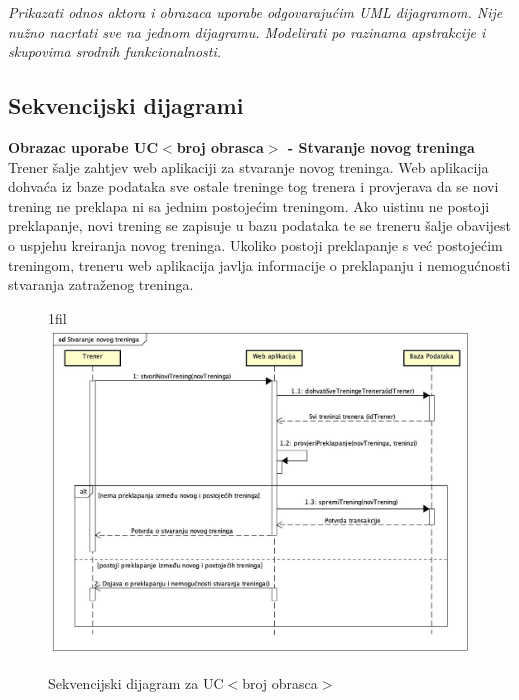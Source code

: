 					\textit{Prikazati odnos aktora i obrazaca uporabe odgovarajućim UML dijagramom. Nije nužno nacrtati sve na jednom dijagramu. Modelirati po razinama apstrakcije i skupovima srodnih funkcionalnosti.}
				\eject		
				
								
				
				
			\subsection{Sekvencijski dijagrami}
			
			
				\textbf{Obrazac uporabe UC$<$broj obrasca$>$ - Stvaranje novog treninga}\\
				Trener šalje zahtjev web aplikaciji za stvaranje novog treninga. Web aplikacija dohvaća iz baze podataka sve ostale treninge tog trenera i provjerava da se novi trening ne preklapa ni sa jednim postojećim treningom. Ako uistinu ne postoji preklapanje, novi trening se zapisuje u bazu podataka te se treneru šalje obavijest o uspjehu kreiranja novog treninga. Ukoliko postoji preklapanje s već postojećim treningom, treneru web aplikacija javlja informacije o preklapanju i nemogućnosti stvaranja zatraženog treninga.
				\eject
				
				\makeatletter
                                                                        \newcommand*{\centerfloat}{%
                                                                          \parindent \z@
                                                                          \leftskip \z@ \@plus 1fil \@minus \textwidth
                                                                          \rightskip\leftskip
                                                                          \parfillskip \z@skip}
                                                                   \makeatother
				
				\begin{figure}[H]
					\centerfloat
        					\includegraphics[scale=0.48]{dijagrami/StvaranjeNovogTreninga.jpg} %
        					\caption{Sekvencijski dijagram za UC$<$broj obrasca$>$}
        					\label{fig:UC$<$broj obrasca$>$}
				\end{figure}
				
